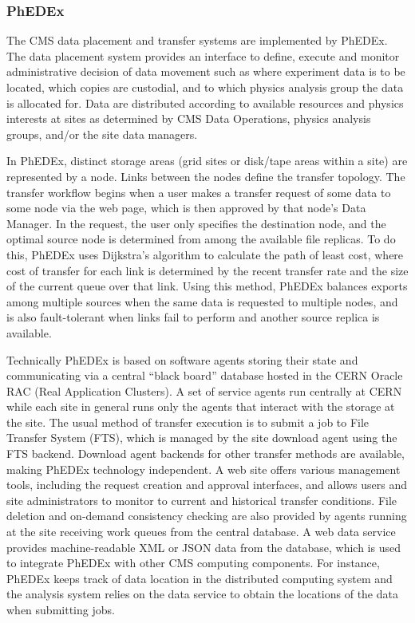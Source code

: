 \subsubsection{PhEDEx}
\label{sec:3_1_4}
The CMS data placement and transfer systems are implemented by
PhEDEx\cite{RefPhEDEx}. The data placement system provides an
interface to define, execute and monitor administrative decision of
data movement such as where experiment data is to be located, which
copies are custodial, and to which physics analysis group the data is
allocated for.  Data are distributed according to available resources
and physics interests at sites as determined by CMS Data Operations,
physics analysis groups, and/or the site data managers.

In PhEDEx, distinct storage areas (grid sites or disk/tape areas
within a site) are represented by a node.  Links between the nodes
define the transfer topology.  The transfer workflow begins when a
user makes a transfer request of some data to some node via the web
page, which is then approved by that node's Data Manager.  In the
request, the user only specifies the destination node, and the optimal
source node is determined from among the available file replicas.  To
do this, PhEDEx uses Dijkstra's algorithm to calculate the path of
least cost, where cost of transfer for each link is determined by the
recent transfer rate and the size of the current queue over that link.
Using this method, PhEDEx balances exports among multiple sources when
the same data is requested to multiple nodes, and is also
fault-tolerant when links fail to perform and another source replica
is available.

Technically PhEDEx is based on software agents storing their state and
communicating via a central ``black board'' database hosted in the
CERN Oracle RAC (Real Application Clusters). A set of service agents
run centrally at CERN while each site in general runs
only the agents that interact with the storage at the site. The usual
method of transfer execution is to submit a job to File Transfer System (FTS), 
which is managed by the site download agent using the FTS backend.  Download
agent backends for other transfer methods are available, making PhEDEx
technology independent. A web site offers various management tools,
including the request creation and approval interfaces, and allows
users and site administrators to monitor to current and historical
transfer conditions.  File deletion and on-demand consistency checking
are also provided by agents running at the site receiving work queues
from the central database.  A web data service provides
machine-readable XML or JSON data from the database, which is used to
integrate PhEDEx with other CMS computing components.  For instance,
PhEDEx keeps track of data location in the distributed computing
system and the analysis system relies on the data service to obtain
the locations of the data when submitting jobs.

